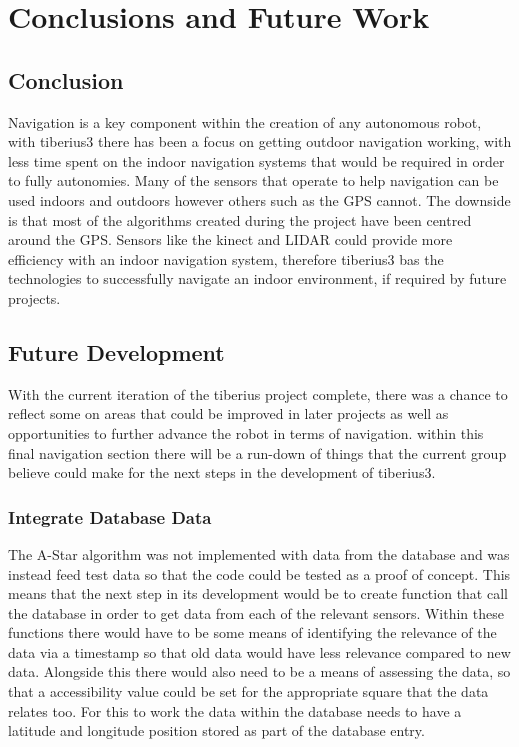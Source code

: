 \section{Conclusions and Future Work}

\subsection{Conclusion}
Navigation is a key component within the creation of any autonomous robot, with \gls{tiberius3} there has been a focus on getting outdoor navigation working, with less time spent on the indoor navigation systems that would be required in order to fully autonomies.
\newline
Many of the sensors that operate to help navigation can be used indoors and outdoors however others such as the \gls{GPS} cannot. The downside is that most of the algorithms created during the project have been centred around the \gls{GPS}. Sensors like the kinect and \gls{LIDAR} could provide more efficiency with an indoor navigation system, therefore \gls{tiberius3} bas the technologies to successfully navigate an indoor environment, if required by future projects.
\subsection{Future Development}
With the current iteration of the tiberius project complete, there was a chance to reflect some on areas that could be improved in later projects as well as opportunities to further advance the robot in terms of navigation. within this final navigation section there will be a run-down of things that the current group believe could make for the next steps in the development of \gls{tiberius3}. 
\subsubsection{Integrate Database Data}
The A-Star algorithm was not implemented with data from the database and was instead feed test data so that the code could be tested as a proof of concept. This means that the next step in its development would be to create function that call the database in order to get data from each of the relevant sensors. Within these functions there would have to be some means of identifying the relevance of the data via a timestamp so that old data would have less relevance compared to new data. Alongside this there would also need to be a means of assessing the data, so that a accessibility value could be set for the appropriate square that the data relates too. For this to work the data within the database needs to have a latitude and longitude position stored as part of the database entry.

